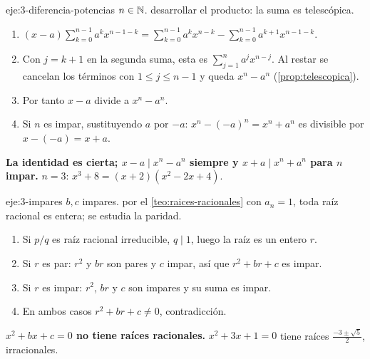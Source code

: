 \begin{solucion}{eje:3-diferencia-potencias}
\datos $n\in\mathbb{N}$.
\planteamiento desarrollar el producto: la suma es telescópica.
\pasos
\begin{enumerate}[label=\arabic*.]
  \item $(x-a)\sum_{k=0}^{n-1}a^kx^{n-1-k}=\sum_{k=0}^{n-1}a^kx^{n-k}-\sum_{k=0}^{n-1}a^{k+1}x^{n-1-k}$.
  \item Con $j=k+1$ en la segunda suma, esta es $\sum_{j=1}^{n}a^jx^{n-j}$. Al restar se cancelan los términos con $1\le j\le n-1$ y queda $x^n-a^n$ (\cref{prop:telescopica}).
  \item Por tanto $x-a$ divide a $x^n-a^n$.
  \item Si $n$ es impar, sustituyendo $a$ por $-a$: $x^n-(-a)^n=x^n+a^n$ es divisible por $x-(-a)=x+a$.
\end{enumerate}
\resultado \textbf{La identidad es cierta; $x-a\mid x^n-a^n$ siempre y $x+a\mid x^n+a^n$ para $n$ impar.}
\comprobacion $n=3$: $x^3+8=(x+2)(x^2-2x+4)$.
\end{solucion}

\begin{solucion}{eje:3-impares}
\datos $b,c$ impares.
\planteamiento por el \cref{teo:raices-racionales} con $a_n=1$, toda raíz racional es entera; se estudia la paridad.
\pasos
\begin{enumerate}[label=\arabic*.]
  \item Si $p/q$ es raíz racional irreducible, $q\mid1$, luego la raíz es un entero $r$.
  \item Si $r$ es par: $r^2$ y $br$ son pares y $c$ impar, así que $r^2+br+c$ es impar.
  \item Si $r$ es impar: $r^2$, $br$ y $c$ son impares y su suma es impar.
  \item En ambos casos $r^2+br+c\neq0$, contradicción.
\end{enumerate}
\resultado \textbf{$x^2+bx+c=0$ no tiene raíces racionales.}
\comprobacion $x^2+3x+1=0$ tiene raíces $\frac{-3\pm\sqrt5}2$, irracionales.
\end{solucion}

